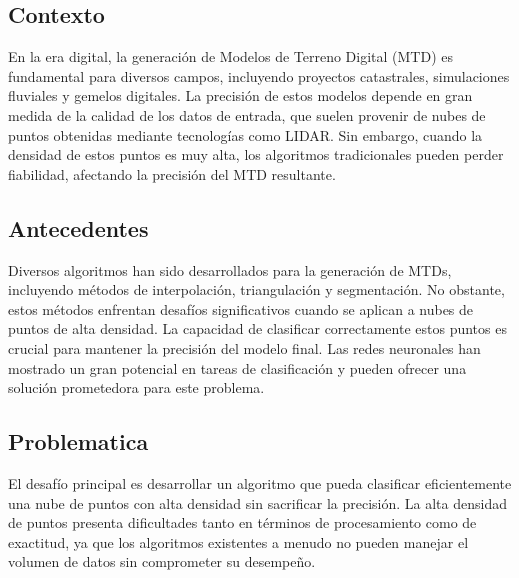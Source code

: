 
\subsection{Contexto}
En la era digital, la generación de Modelos de Terreno Digital (MTD) es fundamental para diversos campos, incluyendo proyectos catastrales, simulaciones fluviales y gemelos digitales. La precisión de estos modelos depende en gran medida de la calidad de los datos de entrada, que suelen provenir de nubes de puntos obtenidas mediante tecnologías como LIDAR. Sin embargo, cuando la densidad de estos puntos es muy alta, los algoritmos tradicionales pueden perder fiabilidad, afectando la precisión del MTD resultante.


\subsection{Antecedentes}
Diversos algoritmos han sido desarrollados para la generación de MTDs, incluyendo métodos de interpolación, triangulación y segmentación. No obstante, estos métodos enfrentan desafíos significativos cuando se aplican a nubes de puntos de alta densidad. La capacidad de clasificar correctamente estos puntos es crucial para mantener la precisión del modelo final. Las redes neuronales han mostrado un gran potencial en tareas de clasificación y pueden ofrecer una solución prometedora para este problema.

\subsection{Problematica}
El desafío principal es desarrollar un algoritmo que pueda clasificar eficientemente una nube de puntos con alta densidad sin sacrificar la precisión. La alta densidad de puntos presenta dificultades tanto en términos de procesamiento como de exactitud, ya que los algoritmos existentes a menudo no pueden manejar el volumen de datos sin comprometer su desempeño.

